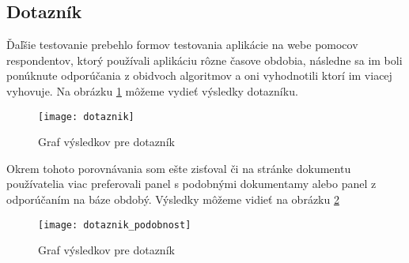 \subsection{Dotazník}

Ďaľšie testovanie prebehlo formov testovania aplikácie na webe pomocov respondentov, ktorý 
používali aplikáciu rôzne časove obdobia, následne sa im boli ponúknute odporúčania z obidvoch 
algoritmov a oni vyhodnotili ktorí im viacej vyhovuje. Na obrázku \ref{fig:dotaznik} môžeme 
vydieť výsledky dotazníku.

\begin{figure}
    \begin{center}
        \texttt{[image: dotaznik]}
        \caption{Graf výsledkov pre dotazník}
        \label{fig:dotaznik}
    \end{center}
\end{figure}

Okrem tohoto porovnávania som ešte zisťoval či na stránke dokumentu používatelia viac preferovali
panel s podobnými dokumentamy alebo panel z odporúčaním na báze obdobý. Výsledky môžeme
vidieť na obrázku \ref{fig:dotaznik_podobnost}


\begin{figure}
    \begin{center}
        \texttt{[image: dotaznik\_podobnost]}
        \caption{Graf výsledkov pre dotazník}
        \label{fig:dotaznik_podobnost}
    \end{center}
\end{figure}
